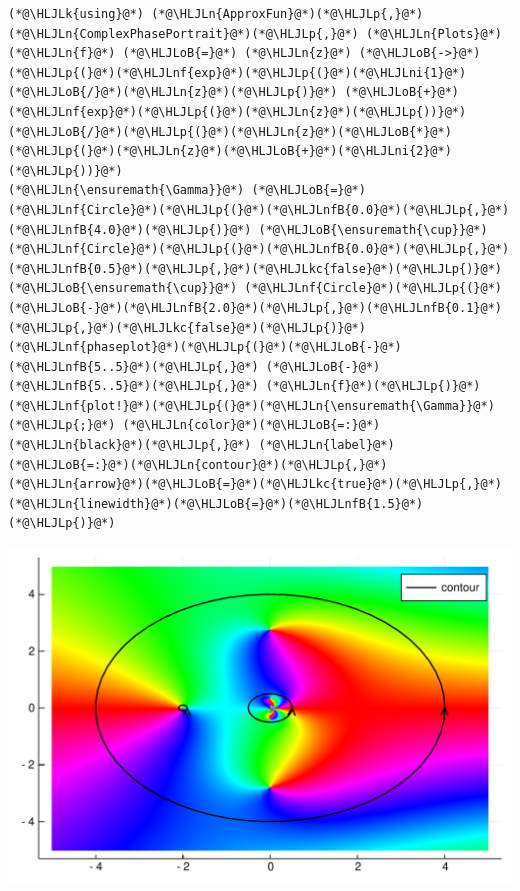 \documentclass[12pt,a4paper]{article}
\newcommand{\HLJLk}[1]{\textcolor[RGB]{148,91,176}{\textbf{#1}}}
\newcommand{\HLJLkc}[1]{\textcolor[RGB]{59,151,46}{\textit{#1}}}
\newcommand{\HLJLn}[1]{#1}
\newcommand{\HLJLnf}[1]{\textcolor[RGB]{66,102,213}{#1}}
\newcommand{\HLJLnfB}[1]{\textcolor[RGB]{59,151,46}{#1}}
\newcommand{\HLJLni}[1]{\textcolor[RGB]{59,151,46}{#1}}
\newcommand{\HLJLoB}[1]{\textcolor[RGB]{102,102,102}{\textbf{#1}}}
\newcommand{\HLJLp}[1]{#1}
\begin{document}
\begin{lstlisting}
(*@\HLJLk{using}@*) (*@\HLJLn{ApproxFun}@*)(*@\HLJLp{,}@*) (*@\HLJLn{ComplexPhasePortrait}@*)(*@\HLJLp{,}@*) (*@\HLJLn{Plots}@*)
(*@\HLJLn{f}@*) (*@\HLJLoB{=}@*) (*@\HLJLn{z}@*) (*@\HLJLoB{->}@*) (*@\HLJLp{(}@*)(*@\HLJLnf{exp}@*)(*@\HLJLp{(}@*)(*@\HLJLni{1}@*)(*@\HLJLoB{/}@*)(*@\HLJLn{z}@*)(*@\HLJLp{)}@*) (*@\HLJLoB{+}@*) (*@\HLJLnf{exp}@*)(*@\HLJLp{(}@*)(*@\HLJLn{z}@*)(*@\HLJLp{))}@*)(*@\HLJLoB{/}@*)(*@\HLJLp{(}@*)(*@\HLJLn{z}@*)(*@\HLJLoB{*}@*)(*@\HLJLp{(}@*)(*@\HLJLn{z}@*)(*@\HLJLoB{+}@*)(*@\HLJLni{2}@*)(*@\HLJLp{))}@*)
(*@\HLJLn{\ensuremath{\Gamma}}@*) (*@\HLJLoB{=}@*) (*@\HLJLnf{Circle}@*)(*@\HLJLp{(}@*)(*@\HLJLnfB{0.0}@*)(*@\HLJLp{,}@*) (*@\HLJLnfB{4.0}@*)(*@\HLJLp{)}@*) (*@\HLJLoB{\ensuremath{\cup}}@*) (*@\HLJLnf{Circle}@*)(*@\HLJLp{(}@*)(*@\HLJLnfB{0.0}@*)(*@\HLJLp{,}@*)(*@\HLJLnfB{0.5}@*)(*@\HLJLp{,}@*)(*@\HLJLkc{false}@*)(*@\HLJLp{)}@*) (*@\HLJLoB{\ensuremath{\cup}}@*) (*@\HLJLnf{Circle}@*)(*@\HLJLp{(}@*)(*@\HLJLoB{-}@*)(*@\HLJLnfB{2.0}@*)(*@\HLJLp{,}@*)(*@\HLJLnfB{0.1}@*)(*@\HLJLp{,}@*)(*@\HLJLkc{false}@*)(*@\HLJLp{)}@*)
(*@\HLJLnf{phaseplot}@*)(*@\HLJLp{(}@*)(*@\HLJLoB{-}@*)(*@\HLJLnfB{5..5}@*)(*@\HLJLp{,}@*) (*@\HLJLoB{-}@*)(*@\HLJLnfB{5..5}@*)(*@\HLJLp{,}@*) (*@\HLJLn{f}@*)(*@\HLJLp{)}@*)
(*@\HLJLnf{plot!}@*)(*@\HLJLp{(}@*)(*@\HLJLn{\ensuremath{\Gamma}}@*)(*@\HLJLp{;}@*) (*@\HLJLn{color}@*)(*@\HLJLoB{=:}@*)(*@\HLJLn{black}@*)(*@\HLJLp{,}@*) (*@\HLJLn{label}@*)(*@\HLJLoB{=:}@*)(*@\HLJLn{contour}@*)(*@\HLJLp{,}@*) (*@\HLJLn{arrow}@*)(*@\HLJLoB{=}@*)(*@\HLJLkc{true}@*)(*@\HLJLp{,}@*) (*@\HLJLn{linewidth}@*)(*@\HLJLoB{=}@*)(*@\HLJLnfB{1.5}@*)(*@\HLJLp{)}@*)
\end{lstlisting}

\includegraphics[width=\linewidth]{figures/Lecture11_1_1.pdf}
\end{document}
